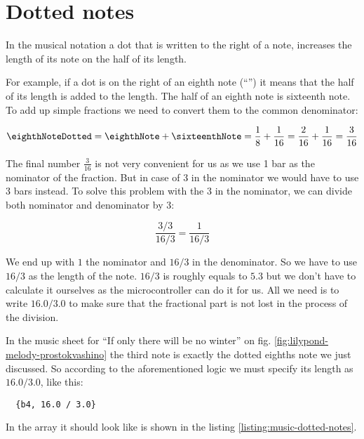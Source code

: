 \documentclass[../sparc.tex]{subfiles}
\begin{document}
\section{Dotted notes}
\label{section:dotted-notes}

In the musical notation a dot that is written to the right of a note, increases
the length of its note on the half of its length.

For example, if a dot is on the right of an eighth note (``\eighthNoteDotted'')
it means that the half of its length is added to the length.  The half of an
eighth note is sixteenth note.  To add up simple fractions we need to convert
them to the common denominator:

\begin{equation}
  \mbox{\eighthNoteDotted} = \mbox{\eighthNote} + \mbox{\sixteenthNote}
  = \frac{1}{8} + \frac{1}{16} = \frac{2}{16} + \frac{1}{16} = \frac{3}{16}
\end{equation}

The final number $\frac{3}{16}$ is not very convenient for us as we use 1 bar as
the nominator of the fraction.  But in case of 3 in the nominator we would have
to use 3 bars instead.  To solve this problem with the 3 in the nominator, we
can divide both nominator and denominator by 3:

\begin{equation}
  \frac{3 / 3}{16 / 3} = \frac{1}{16 / 3}
\end{equation}

We end up with $1$ the nominator and $16 / 3$ in the denominator.  So we have to
use $16 / 3$ as the length of the note.  $16 / 3$ is roughly equals to $5.3$ but
we don't have to calculate it ourselves as the microcontroller can do it for us.
All we need is to write $16.0 / 3.0$ to make sure that the fractional part is
not lost in the process of the division.

In the music sheet for ``If only there will be no winter'' on
fig. \ref{fig:lilypond-melody-prostokvashino} the third note is exactly the
dotted eighths note we just discussed.  So according to the aforementioned logic
we must specify its length as $16.0 / 3.0$, like this:

\begin{verbatim}
  {b4, 16.0 / 3.0}
\end{verbatim}

In the array it should look like is shown in the listing
\ref{listing:music-dotted-notes}.
\end{document}
